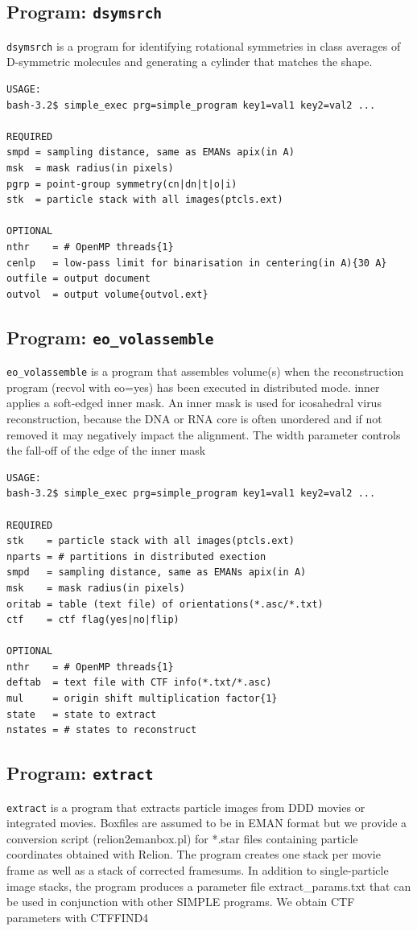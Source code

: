 \documentclass[a4paper,11pt]{article}
\newcommand{\prgname}[1]{\textcolor{NavyBlue}{\texttt{#1}}}
\begin{document}
\subsection{Program: \prgname{dsymsrch}}
\label{dsymsrch}
\prgname{dsymsrch} is a program for identifying rotational symmetries in class averages of D-symmetric molecules and generating a cylinder that matches the shape.

\begin{verbatim}
USAGE:
bash-3.2$ simple_exec prg=simple_program key1=val1 key2=val2 ...

REQUIRED
smpd = sampling distance, same as EMANs apix(in A)
msk  = mask radius(in pixels)
pgrp = point-group symmetry(cn|dn|t|o|i)
stk  = particle stack with all images(ptcls.ext)

OPTIONAL
nthr    = # OpenMP threads{1}
cenlp   = low-pass limit for binarisation in centering(in A){30 A}
outfile = output document
outvol  = output volume{outvol.ext}
\end{verbatim}

\subsection{Program: \prgname{eo\_volassemble}}
\label{eo_volassemble}
\prgname{eo\_volassemble} is a program that assembles volume(s) when the reconstruction program (recvol with eo=yes) has been executed in distributed mode. inner applies a soft-edged inner mask. An inner mask is used for icosahedral virus reconstruction, because the DNA or RNA core is often unordered and  if not removed it may negatively impact the alignment. The width parameter controls the fall-off of the edge of the inner mask

\begin{verbatim}
USAGE:
bash-3.2$ simple_exec prg=simple_program key1=val1 key2=val2 ...

REQUIRED
stk    = particle stack with all images(ptcls.ext)
nparts = # partitions in distributed exection
smpd   = sampling distance, same as EMANs apix(in A)
msk    = mask radius(in pixels)
oritab = table (text file) of orientations(*.asc/*.txt)
ctf    = ctf flag(yes|no|flip)

OPTIONAL
nthr    = # OpenMP threads{1}
deftab  = text file with CTF info(*.txt/*.asc)
mul     = origin shift multiplication factor{1}
state   = state to extract
nstates = # states to reconstruct
\end{verbatim}

\subsection{Program: \prgname{extract}}
\label{extract}
\prgname{extract} is a program that extracts particle images from DDD movies or integrated movies. Boxfiles are assumed to be in EMAN format but we provide a conversion script (relion2emanbox.pl) for *.star files containing particle coordinates obtained with Relion. The program creates one stack per movie frame as well as a stack of corrected framesums. In addition to single-particle image stacks, the program produces a parameter file extract\_params.txt that can be used in conjunction with other SIMPLE programs. We obtain CTF parameters with CTFFIND4
\end{document}
